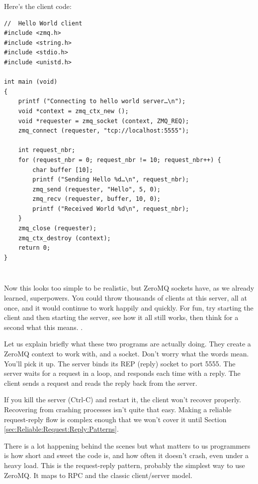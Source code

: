 Here's the client code:
\begin{verbatim}
//  Hello World client
#include <zmq.h>
#include <string.h>
#include <stdio.h>
#include <unistd.h>

int main (void)
{
    printf ("Connecting to hello world server…\n");
    void *context = zmq_ctx_new ();
    void *requester = zmq_socket (context, ZMQ_REQ);
    zmq_connect (requester, "tcp://localhost:5555");

    int request_nbr;
    for (request_nbr = 0; request_nbr != 10; request_nbr++) {
        char buffer [10];
        printf ("Sending Hello %d…\n", request_nbr);
        zmq_send (requester, "Hello", 5, 0);
        zmq_recv (requester, buffer, 10, 0);
        printf ("Received World %d\n", request_nbr);
    }
    zmq_close (requester);
    zmq_ctx_destroy (context);
    return 0;
}
\end{verbatim}
\inputminted[baselinestretch=0.8,stripnl=false]{scheme}{../tests/hello-world/client.scm}
\inputminted[baselinestretch=0.8,stripnl=false]{scheme}{../tests/hello-world/client-sugar.scm}

Now this looks too simple to be realistic, but ZeroMQ sockets have, as we
already learned, superpowers. You could throw thousands of clients at this
server, all at once, and it would continue to work happily and quickly. For
fun, try starting the client and then starting the server, see how it all still
works, then think for a second what this means. .

Let us explain briefly what these two programs are actually doing. They create
a ZeroMQ context to work with, and a socket. Don't worry what the words mean.
You'll pick it up. The server binds its REP (reply) socket to port 5555. The
server waits for a request in a loop, and responds each time with a reply. The
client sends a request and reads the reply back from the server.

If you kill the server (Ctrl-C) and restart it, the client won't recover
properly. Recovering from crashing processes isn't quite that easy. Making a
reliable request-reply flow is complex enough that we won't cover it until
Section \ref{sec:Reliable:Request:Reply:Patterns}.

There is a lot happening behind the scenes but what matters to us programmers
is how short and sweet the code is, and how often it doesn't crash, even under
a heavy load. This is the request-reply pattern, probably the simplest way to
use ZeroMQ. It maps to RPC and the classic client/server model.

